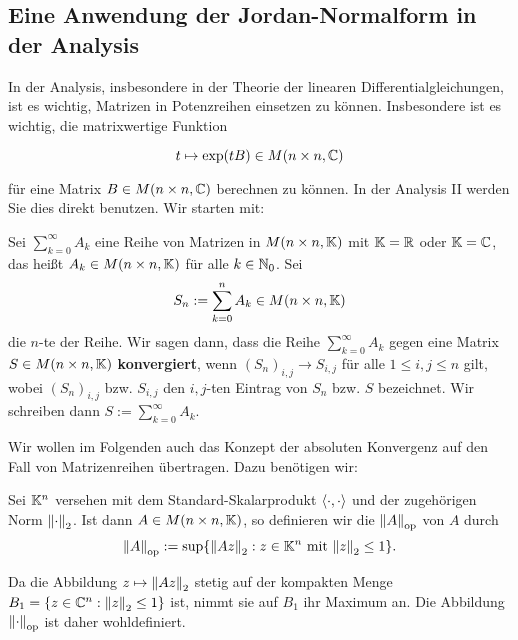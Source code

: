 \subsection{Eine Anwendung der Jordan-Normalform in der Analysis}
\label{sec:2.10}

In der Analysis, insbesondere in der Theorie der linearen Differentialgleichungen, ist es wichtig, Matrizen in Potenzreihen einsetzen zu können.
Insbesondere ist es wichtig, die matrixwertige Funktion

\[
	t \mapsto \exp(tB) \in M(n \times n, \mathbb{C})
\]

für eine Matrix $B \in M(n \times n, \mathbb{C})$ berechnen zu können.
In der Analysis II werden Sie dies direkt benutzen.
Wir starten mit:

\begin{definition}
	\label{def:10.1}
	Sei $\sum_{k=0}^{\infty} A_k$ eine Reihe von Matrizen in $M(n \times n, \mathbb{K})$ mit $\mathbb{K} = \mathbb{R}$ oder $\mathbb{K}= \mathbb{C}$, das heißt $A_k \in M(n \times n,\mathbb{K})$ für alle $k \in \mathbb{N}_0$.
	Sei
	\[
		S_n := \sum_{k=0}^{n} A_k \in M(n \times n, \mathbb{K})
	\]
	die $n$-te  der Reihe.
	Wir sagen dann, dass die Reihe $\sum_{k=0}^{\infty} A_k$ gegen eine Matrix $S \in M(n \times n, \mathbb{K})$ \textbf{konvergiert}, wenn $(S_n)_{i,j} \rightarrow S_{i,j}$ für alle $1 \leq i,j \leq n$ gilt, wobei $(S_n)_{i,j}$ bzw. $S_{i,j}$ den $i,j$-ten Eintrag von $S_n$ bzw. $S$ bezeichnet.
	Wir schreiben dann $S := \sum_{k=0}^{\infty} A_k$.  
\end{definition}

Wir wollen im Folgenden auch das Konzept der absoluten Konvergenz auf den Fall von Matrizenreihen übertragen.
Dazu benötigen wir:

\begin{definition}[Operatornorm]
	\label{def:10.2}
	Sei $\mathbb{K}^n$ versehen mit dem Standard-Skalarprodukt $\left\langle\cdot,\cdot\right\rangle$ und der zugehörigen Norm $\left\lVert\cdot\right\rVert_2$.
	Ist dann $A \in M(n \times n, \mathbb{K})$, so definieren wir die  $\left\lVert A\right\rVert_{\text{op}}$ von $A$ durch
	\[
		\opn{A} := \sup \{ \no{Az}_2 : z \in \KK^n \text{ mit } \no{z}_2 \leq 1\}.
	\]
\end{definition}

Da die Abbildung $z \mapsto \left\lVert Az\right\rVert_2$ stetig auf der kompakten Menge $B_1 = \{z \in \mathbb{C}^n : \left\lVert z\right\rVert_2 \leq 1\}$ ist, nimmt sie auf $B_1$ ihr Maximum an.
Die Abbildung $\left\lVert\cdot\right\rVert_{\text{op}}$ ist daher wohldefiniert.


